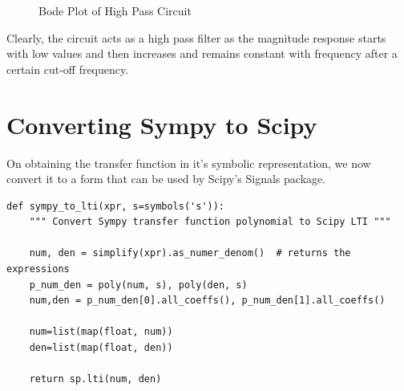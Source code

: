 \documentclass{article}
\begin{document}
\begin{figure}[!tbh]
    \centering
    \qquad
    \caption{Bode Plot of High Pass Circuit}%
    \label{fig:example2}%
\end{figure}
\noindent
Clearly, the circuit acts as a high pass filter as the magnitude response starts with low values and then increases and remains constant with frequency after a certain cut-off frequency.

\section{Converting Sympy to Scipy}
On obtaining the transfer function in it's symbolic representation, we now convert it to a form that can be used by Scipy's Signals package.

\begin{lstlisting}
def sympy_to_lti(xpr, s=symbols('s')):
    """ Convert Sympy transfer function polynomial to Scipy LTI """

    num, den = simplify(xpr).as_numer_denom()  # returns the expressions
    p_num_den = poly(num, s), poly(den, s)
    num,den = p_num_den[0].all_coeffs(), p_num_den[1].all_coeffs()

    num=list(map(float, num))
    den=list(map(float, den))

    return sp.lti(num, den)

\end{lstlisting}
\end{document}

